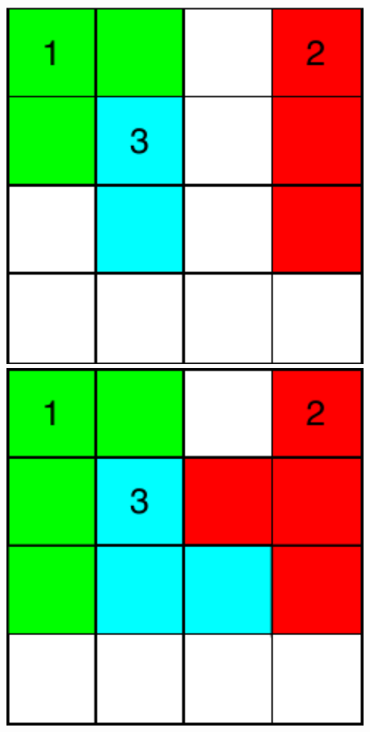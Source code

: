 \begin{frame}
\begin{columns}
\begin{overprint}
		\centering\includegraphics[width=0.9\textwidth]{images/expansion-3.pdf}
		\onslide<4|handout:0>\centering\includegraphics[width=0.9\textwidth]{images/expansion-4.pdf}

\end{overprint}
\end{columns}
\end{frame}

